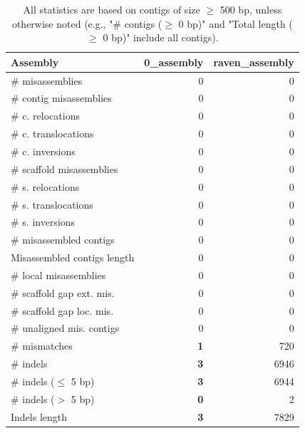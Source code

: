 \documentclass[12pt,a4paper]{article}
\begin{document}
\begin{table}[ht]
\begin{center}
\caption{All statistics are based on contigs of size $\geq$ 500 bp, unless otherwise noted (e.g., "\# contigs ($\geq$ 0 bp)" and "Total length ($\geq$ 0 bp)" include all contigs).}
\begin{tabular}{|l*{2}{|r}|}
\hline
Assembly & 0\_assembly & raven\_assembly \\ \hline
\# misassemblies & 0 & 0 \\ \hline
\hspace{2mm}\# contig misassemblies & 0 & 0 \\ \hline
\hspace{5mm}\# c. relocations & 0 & 0 \\ \hline
\hspace{5mm}\# c. translocations & 0 & 0 \\ \hline
\hspace{5mm}\# c. inversions & 0 & 0 \\ \hline
\hspace{2mm}\# scaffold misassemblies & 0 & 0 \\ \hline
\hspace{5mm}\# s. relocations & 0 & 0 \\ \hline
\hspace{5mm}\# s. translocations & 0 & 0 \\ \hline
\hspace{5mm}\# s. inversions & 0 & 0 \\ \hline
\# misassembled contigs & 0 & 0 \\ \hline
Misassembled contigs length & 0 & 0 \\ \hline
\# local misassemblies & 0 & 0 \\ \hline
\# scaffold gap ext. mis. & 0 & 0 \\ \hline
\# scaffold gap loc. mis. & 0 & 0 \\ \hline
\# unaligned mis. contigs & 0 & 0 \\ \hline
\# mismatches & {\bf 1} & 720 \\ \hline
\# indels & {\bf 3} & 6946 \\ \hline
\hspace{5mm}\# indels ($\leq$ 5 bp) & {\bf 3} & 6944 \\ \hline
\hspace{5mm}\# indels ($>$ 5 bp) & {\bf 0} & 2 \\ \hline
Indels length & {\bf 3} & 7829 \\ \hline
\end{tabular}
\end{center}
\end{table}
\end{document}

